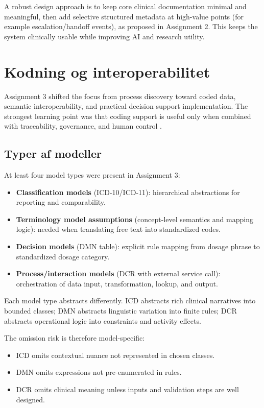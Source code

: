 A robust design approach is to keep core clinical documentation minimal and meaningful, then add selective structured metadata at high-value points (for example escalation/handoff events), as proposed in Assignment 2. This keeps the system clinically usable while improving AI and research utility.

\clearpage

\section{Kodning og interoperabilitet}
\label{sec:kodning_interoperabilitet}

Assignment 3 shifted the focus from process discovery toward coded data, semantic interoperability, and practical decision support implementation. The strongest learning point was that coding support is useful only when combined with traceability, governance, and human control \parencite{kristensen2026assignment3repo}.

\subsection{Typer af modeller}
\label{subsec:kodning_typer_modeller}

At least four model types were present in Assignment 3:
\begin{itemize}
    \item \textbf{Classification models} (ICD-10/ICD-11): hierarchical abstractions for reporting and comparability.
    \item \textbf{Terminology model assumptions} (concept-level semantics and mapping logic): needed when translating free text into standardized codes.
    \item \textbf{Decision models} (DMN table): explicit rule mapping from dosage phrase to standardized dosage category.
    \item \textbf{Process/interaction models} (DCR with external service call): orchestration of data input, transformation, lookup, and output.
\end{itemize}

Each model type abstracts differently. ICD abstracts rich clinical narratives into bounded classes; DMN abstracts linguistic variation into finite rules; DCR abstracts operational logic into constraints and activity effects.

The omission risk is therefore model-specific:
\begin{itemize}
    \item ICD omits contextual nuance not represented in chosen classes.
    \item DMN omits expressions not pre-enumerated in rules.
    \item DCR omits clinical meaning unless inputs and validation steps are well designed.
\end{itemize}

